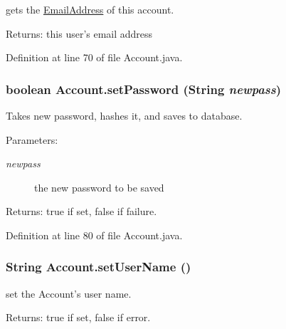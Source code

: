 gets the \hyperlink{classEmailAddress}{EmailAddress} of this account. 

\begin{Desc}
\item[Returns:]this user's email address \end{Desc}


Definition at line 70 of file Account.java.\hypertarget{classAccount_afe1f765fc54335bee76563973e09cb2}{
\subsubsection{\setlength{\rightskip}{0pt plus 5cm}boolean Account.setPassword (String {\em newpass})}}
\label{classAccount_afe1f765fc54335bee76563973e09cb2}


Takes new password, hashes it, and saves to database. 

\begin{Desc}
\item[Parameters:]
\begin{description}
\item[{\em newpass}]the new password to be saved \end{description}
\end{Desc}
\begin{Desc}
\item[Returns:]true if set, false if failure. \end{Desc}


Definition at line 80 of file Account.java.\hypertarget{classAccount_b243d54ab5be144d1185b0717f98955f}{
\subsubsection{\setlength{\rightskip}{0pt plus 5cm}String Account.setUserName ()}}
\label{classAccount_b243d54ab5be144d1185b0717f98955f}


set the Account's user name. 

\begin{Desc}
\item[Returns:]true if set, false if error. \end{Desc}


